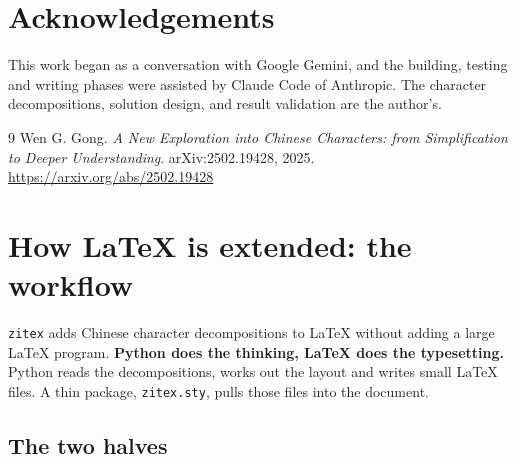 \documentclass[11pt]{article}
\newcommand{\cmd}[1]{\texttt{\textbackslash #1}}               %
\begin{document}
\section*{Acknowledgements}
This work began as a conversation with Google Gemini, and the building, testing and writing phases were assisted by Claude Code of Anthropic. The character decompositions, solution design, and result validation are the author’s.

\begin{thebibliography}{9}
 Wen G. Gong. \emph{A New Exploration into Chinese Characters: from Simplification to Deeper Understanding}.
arXiv:2502.19428, 2025. \url{https://arxiv.org/abs/2502.19428}
\end{thebibliography}

\appendix
\section{How \LaTeX{} is extended: the workflow}
\texttt{zitex} adds Chinese character decompositions to \LaTeX{} without adding a large \LaTeX{} program.
\textbf{Python does the thinking, \LaTeX{} does the typesetting.} Python reads the decompositions, works out the
layout and writes small \LaTeX{} files. A thin package, \texttt{zitex.sty}, pulls those files into the document.

\subsection{The two halves}
\begin{center}
\small
{}
\end{center}
\end{document}
